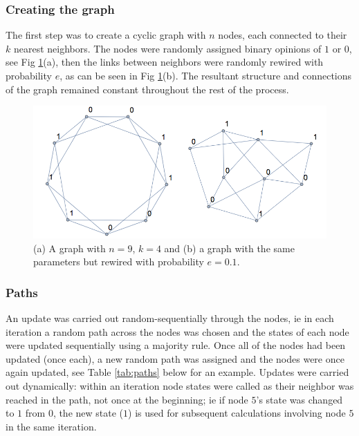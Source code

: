 \documentclass[a4paper, 10pt]{IEEEtran}
\begin{document}
\subsubsection{Creating the graph}
\label{subsub:creation}

The first step was to create a cyclic graph with $n$ nodes, each connected to their $k$ nearest neighbors. The nodes were randomly assigned binary opinions of $1$ or $0$, see Fig \ref{fig:graphing}(a), then the links between neighbors were randomly rewired with probability $e$, as can be seen in Fig \ref{fig:graphing}(b). The resultant structure and connections of the graph remained constant throughout the rest of the process.\par

\begin{figure}[H]
\centering
\includegraphics[width=\linewidth]{graphs.png}
\caption{(a) A graph with $n = 9$, $k = 4$ and (b) a graph with the same parameters but rewired with probability $e = 0.1$.}
\label{fig:graphing}
\end{figure}

\subsubsection{Paths}
\label{subsub:paths}

An update was carried out random-sequentially through the nodes, ie in each iteration a random path across the nodes was chosen and the states of each node were updated sequentially using a majority rule. Once all of the nodes had been updated (once each), a new random path was assigned and the nodes were once again updated, see Table \ref{tab:paths} below for an example. Updates were carried out dynamically: within an iteration node states were called as their neighbor was reached in the path, not once at the beginning; ie if node $5$'s state was changed to $1$ from $0$, the new state ($1$) is used for subsequent calculations involving node $5$ in the same iteration.
\end{document}

